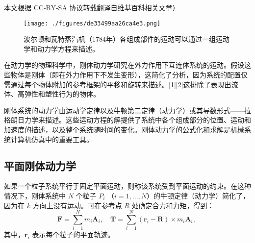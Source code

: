 
本文根据 CC-BY-SA 协议转载翻译自维基百科\href{https://en.wikipedia.org/wiki/Rigid_body_dynamics}{相关文章}）

\begin{figure}[ht]
\centering
\texttt{[image: ./figures/de33499aa26ca4e3.png]}
\caption{波尔顿和瓦特蒸汽机（1784年）各组成部件的运动可以通过一组运动学和动力学方程来描述。} \label{fig_GTDL_1}
\end{figure}
在动力学的物理科学中，刚体动力学研究在外力作用下互连体系统的运动。假设这些物体是刚体（即在外力作用下不发生变形），这简化了分析，因为系统的配置仅需通过每个物体附加的参考框架的平移和旋转来描述。[1][2]这排除了表现出流体、高弹性和塑性行为的物体。

刚体系统的动力学由运动学定律以及牛顿第二定律（动力学）或其导数形式——拉格朗日力学来描述。这些运动方程的解提供了系统中各个组成部分的位置、运动和加速度的描述，以及整个系统随时间的变化。刚体动力学的公式化和求解是机械系统计算机仿真中的重要工具。
\subsection{平面刚体动力学}
如果一个粒子系统平行于固定平面运动，则称该系统受到平面运动的约束。在这种情况下，刚体系统中 \( N \) 个粒子 \( P_i \) （\( i=1,...,N \)）的牛顿定律（动力学）简化了，因为在 \( k \) 方向上没有运动。可在参考点 \( R \) 处确定合力和力矩，得到：
\[
\mathbf{F} = \sum_{i=1}^{N} m_{i} \mathbf{A}_{i}, \quad \mathbf{T} = \sum_{i=1}^{N} (\mathbf{r}_{i} - \mathbf{R}) \times m_{i} \mathbf{A}_{i},~
\]
其中，\( \mathbf{r}_i \) 表示每个粒子的平面轨迹。

